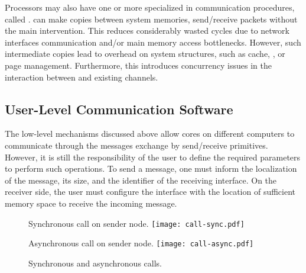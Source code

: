 			Processors may also have one or more \cpus specialized in
			communication procedures, called \dma.
			\dmas can make copies between system memories, send/receive packets
			without the main \cpus intervention.
			This reduces considerably wasted cycles due to network interfaces
			communication and/or main memory access bottlenecks.
			However, such intermediate copies lead to overhead on system structures,
			such as cache, \tlb, or page management.
			Furthermore, this introduces concurrency issues in the interaction between
			\cpus and existing \dma channels.

		\subsection{User-Level Communication Software}
		\label{sec.multicomputers-user-sw}

			The low-level mechanisms discussed above allow cores on different
			computers to communicate through the messages exchange by
			send/receive primitives.
			However, it is still the responsibility of the user to define the
			required parameters to perform such operations.
			To send a message, one must inform the
			localization of the message, its size, and the identifier of the
			receiving interface.
			On the receiver side, the user must configure the interface with
			the location of sufficient memory space to receive the incoming message.

			\begin{figure}[!tb]
				\centering%
				\caption{Synchronous and asynchronous calls.}%
				\label{fig:calls-types}%

					{Synchronous call on sender node.}%
					{\texttt{[image: call-sync.pdf]}}%

				\vspace{0.5cm}%

					{Asynchronous call on sender node.}%
					{\texttt{[image: call-async.pdf]}}%

			\end{figure}

